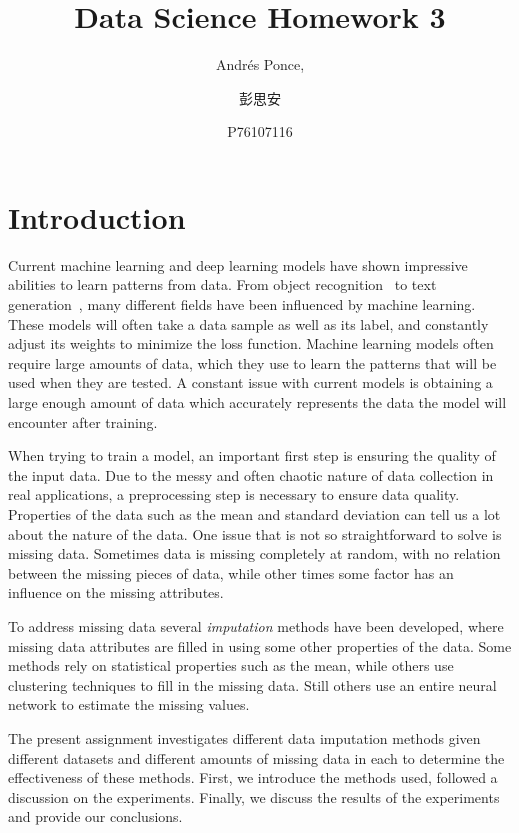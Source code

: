 \documentclass[12pt]{article}
\begin{document}
\title{Data Science Homework 3}
\author{Andr\'es Ponce,
\and
彭思安
\and
P76107116
}
\maketitle
\section{Introduction}
Current machine learning and deep learning models have shown impressive
abilities to learn patterns from data.
From object recognition~\cite{he2016deep} to text generation~\cite{brown2020language},
many different fields have been influenced by machine learning.
These models will often take a data sample as well as its label, and
constantly adjust its weights to minimize the loss function.
Machine learning models often require large amounts of data, which they
use to learn the patterns that will be used when they are tested.
A constant issue with current models is obtaining a large enough amount
of data which accurately represents the data the model will encounter 
after training.

When trying to train a model, an important first step is ensuring the quality
of the input data.
Due to the messy and often chaotic nature of data collection in real 
applications, a preprocessing step is necessary to ensure data quality.
Properties of the data such as the mean and standard deviation can tell
us a lot about the nature of the data.
One issue that is not so straightforward to solve is missing data.
Sometimes data is missing completely at random, with no relation 
between the missing pieces of data, while other times some
factor has an influence on the missing attributes.

To address missing data several \emph{imputation} methods have been 
developed, where missing data attributes are filled in using some other
properties of the data.
Some methods rely on statistical properties such as the mean, while
others use clustering techniques to fill in the missing data.
Still others use an entire neural network to estimate the missing values.

The present assignment investigates different data imputation methods
given different datasets and different amounts of missing data in each
to determine the effectiveness of these methods.
First, we introduce the methods used, followed a discussion on the 
experiments.
Finally, we discuss the results of the experiments and provide our
conclusions.
\end{document}
